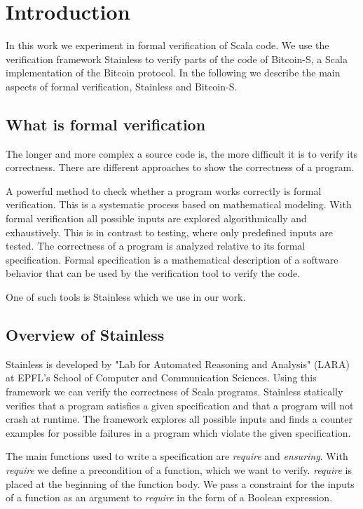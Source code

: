 \chapter{Introduction}
\label{chap:introduction}

In this work we experiment in formal verification of Scala code. 
We use the verification framework Stainless to verify parts of the code of Bitcoin-S, a Scala implementation of the Bitcoin protocol.
In the following we describe the main aspects of formal verification, Stainless and Bitcoin-S.


\section{What is formal verification}
\label{sec:formal_verification}

The longer and more complex a source code is, the more difficult it is to verify its correctness.
There are different approaches to show the correctness of a program.

A powerful method to check whether a program works correctly is formal verification.
This is a systematic process based on mathematical modeling.
With formal verification all possible inputs are explored algorithmically and exhaustively.
This is in contrast to testing, where only predefined inputs are tested.
The correctness of a program is analyzed relative to its formal specification.
Formal specification is a mathematical description of a software behavior that can be used by the verification tool to verify the code. \cite{sanghavi:formal_verification}

One of such tools is Stainless which we use in our work.


\section{Overview of Stainless}
\label{sec:stainless}

Stainless is developed by "Lab for Automated Reasoning and Analysis" (LARA) at EPFL's School of Computer and Communication Sciences.
Using this framework we can verify the correctness of Scala programs.
Stainless statically verifies that a program satisfies a given specification and that a program will not crash at runtime.
The framework explores all possible inputs and finds a counter examples for possible failures in a program which violate the given specification. \cite{Stainless:introduction}

The main functions used to write a specification are \textit{require} and \textit{ensuring}. 
With \textit{require} we define a precondition of a function, which we want to verify.
\textit{require} is placed at the beginning of the function body.
We pass a constraint for the inputs of a function as an argument to \textit{require} in the form of a Boolean expression.

